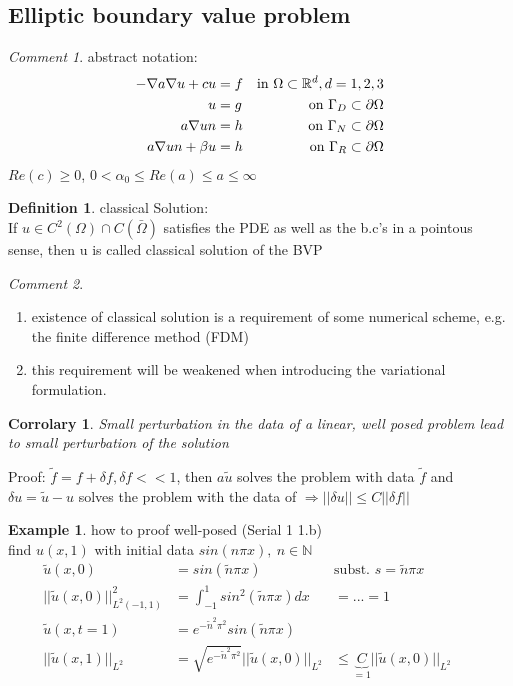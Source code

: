 \documentclass[english]{article}
\newtheorem*{corr}{Corrolary}
\theoremstyle{definition}
\newtheorem*{defi}{Definition}
\newtheorem*{exa}{Example}
\theoremstyle{remark}
\newtheorem*{comm}{Comment}
\newcommand{\p}{\partial}
\newcommand{\NN}{\mathbb{N}}			%
\newcommand{\RR}{\mathbb{R}}			%
\renewcommand{\aa}{\alpha}		%
\newcommand{\bb}{\beta}					%
\newcommand{\OO}{\Omega}
\newcommand{\drw}{\Rightarrow}			%
\newcommand{\tx}[1]{\text{#1}}
\begin{document}
\subsection{Elliptic boundary value problem}
\begin{comm}abstract notation:\\
  \begin{align*}
    -\nabla a \nabla u + c u &= f& \tx{in } \OO\subset\RR^d,d=1,2,3\\
    u&=g & \tx{on }\GG_D \subset \p \OO\\
    a\nabla u n&=h &\tx{on } \GG_N \subset \p \OO \\
    a \nabla u n + \bb u &= h & \tx{on }\GG_{R}\subset \p \OO
  \end{align*}
  $Re(c)\geq 0$, $0<\aa_0\leq Re(a) \leq a \leq \infty$\end{comm}
\begin{defi}classical Solution:\\
  If $u \in C^2(\OO)\cap C(\bar\OO)$ satisfies the PDE as well as the b.c's in a pointous sense, then u is called classical  solution of the BVP
\end{defi}
\begin{comm}
  \begin{enumerate}
  \item existence of classical solution is a requirement of some numerical scheme, e.g. the finite difference method (FDM)
  \item this requirement will be weakened when introducing the variational formulation.
  \end{enumerate}
\end{comm}
\begin{corr}
  Small perturbation in the data of a linear, well posed problem lead to small perturbation of the solution
\end{corr}
Proof: $\tilde f = f + \delta f , \delta f <<1$, then $a \tilde u$ solves the problem with data $\tilde f$ and $\delta u = \tilde u - u$ solves the problem with the data of $\drw ||\delta u || \leq C||\delta f||$

\begin{exa} how to proof well-posed (Serial 1 1.b)\\
  find $u(x,1) $ with initial data $sin(n\pi x) ,\ n \in \NN$
  \begin{align*}
    \tilde u (x,0) &= sin(\tilde n \pi x)& \tx{subst. } s=\tilde n \pi x\\
    ||\tilde u (x,0)||^2_{L^2(-1,1)} &= \int^1_{-1}sin^2(\tilde n \pi x) dx &=... = 1\\
    \tilde u (x,t=1) &= e^{-\tilde n^2\pi^2}sin(\tilde n \pi x)\\
    ||\tilde u (x,1)||_{L^2}&= \sqrt{e^{-\tilde n ^2 \pi^2}}||\tilde u(x,0)||_{L^2} 
    &\leq \underbrace{C}_{=1} ||\tilde u (x,0)||_{L^2} &\quad
  \end{align*}
\end{exa}
\end{document}
